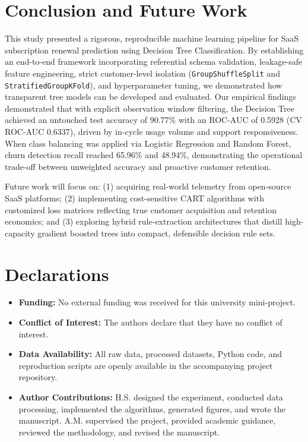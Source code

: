 \documentclass[pdflatex,sn-mathphys-num]{sn-jnl}
\begin{document}
\section{Conclusion and Future Work}\label{sec:conclusion}
This study presented a rigorous, reproducible machine learning pipeline for SaaS subscription renewal prediction using Decision Tree Classification. By establishing an end-to-end framework incorporating referential schema validation, leakage-safe feature engineering, strict customer-level isolation (\texttt{GroupShuffleSplit} and \texttt{StratifiedGroupKFold}), and hyperparameter tuning, we demonstrated how transparent tree models can be developed and evaluated. Our empirical findings demonstrated that with explicit observation window filtering, the Decision Tree achieved an untouched test accuracy of 90.77\% with an ROC-AUC of 0.5928 (CV ROC-AUC 0.6337), driven by in-cycle usage volume and support responsiveness. When class balancing was applied via Logistic Regression and Random Forest, churn detection recall reached 65.96\% and 48.94\%, demonstrating the operational trade-off between unweighted accuracy and proactive customer retention.

Future work will focus on: (1) acquiring real-world telemetry from open-source SaaS platforms; (2) implementing cost-sensitive CART algorithms with customized loss matrices reflecting true customer acquisition and retention economics; and (3) exploring hybrid rule-extraction architectures that distill high-capacity gradient boosted trees into compact, defensible decision rule sets.

\section*{Declarations}
\begin{itemize}
\item \textbf{Funding:} No external funding was received for this university mini-project.
\item \textbf{Conflict of Interest:} The authors declare that they have no conflict of interest.
\item \textbf{Data Availability:} All raw data, processed datasets, Python code, and reproduction scripts are openly available in the accompanying project repository.
\item \textbf{Author Contributions:} H.S. designed the experiment, conducted data processing, implemented the algorithms, generated figures, and wrote the manuscript. A.M. supervised the project, provided academic guidance, reviewed the methodology, and revised the manuscript.
\end{itemize}


\end{document}
